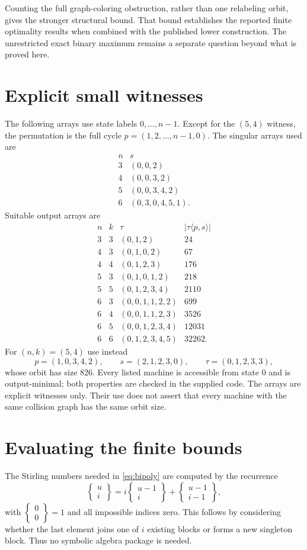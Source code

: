\documentclass[11pt,a4paper]{article}
\numberwithin{equation}{section}
\theoremstyle{definition}
\theoremstyle{remark}
\newcommand{\stirling}[2]{\left\{\!\begin{matrix}#1\\#2\end{matrix}\!\right\}}
\begin{document}
Counting the full graph-coloring obstruction, rather than one relabeling
orbit, gives the stronger structural bound. That bound establishes the
reported finite optimality results when combined with the published lower
construction. The unrestricted exact binary maximum remains a separate
question beyond what is proved here.

\appendix
\section{Explicit small witnesses}\label{app:witnesses}

The following arrays use state labels $0,\ldots,n-1$. Except for the
$(5,4)$ witness, the permutation is the full cycle
$p=(1,2,\ldots,n-1,0)$. The singular arrays used are
\[
\begin{array}{c|l}
 n&s\\\hline
3&(0,0,2)\\
4&(0,0,3,2)\\
5&(0,0,3,4,2)\\
6&(0,3,0,4,5,1).
\end{array}
\]
Suitable output arrays are
\[
\begin{array}{cc|l|r}
n&k&\tau&|\tau\langle p,s\rangle|\\\hline
3&3&(0,1,2)&24\\
4&3&(0,1,0,2)&67\\
4&4&(0,1,2,3)&176\\
5&3&(0,1,0,1,2)&218\\
5&5&(0,1,2,3,4)&2110\\
6&3&(0,0,1,1,2,2)&699\\
6&4&(0,0,1,1,2,3)&3526\\
6&5&(0,0,1,2,3,4)&12031\\
6&6&(0,1,2,3,4,5)&32262.
\end{array}
\]
For $(n,k)=(5,4)$ use instead
\[
 p=(1,0,3,4,2),\qquad s=(2,1,2,3,0),\qquad
 \tau=(0,1,2,3,3),
\]
whose orbit has size $826$. Every listed machine is accessible from state
$0$ and is output-minimal; both properties are checked in the supplied code.
The arrays are explicit witnesses only. Their use does not assert that every
machine with the same collision graph has the same orbit size.

\section{Evaluating the finite bounds}\label{app:bounds}

The Stirling numbers needed in \eqref{eq:bipoly} are computed by the recurrence
\[
 \stirling{u}{i}=i\stirling{u-1}{i}+\stirling{u-1}{i-1},
\]
with $\stirling{0}{0}=1$ and all impossible indices zero. This follows by
considering whether the last element joins one of $i$ existing blocks or
forms a new singleton block. Thus no symbolic algebra package is needed.
\end{document}
